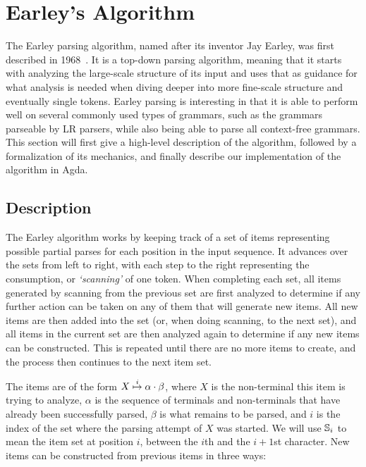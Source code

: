 \chapter{Earley's Algorithm} \label{Earleys}

	The Earley parsing algorithm, named after its inventor Jay Earley, was
	first described in 1968~\cite{Earley}. It is a top-down parsing algorithm,
	meaning that it starts with analyzing the large-scale structure of its
	input and uses that as guidance for what analysis is needed when diving
	deeper into more fine-scale structure and eventually single tokens.  Earley
	parsing is interesting in that it is able to perform well on several
	commonly used types of grammars, such as the grammars parseable by LR
	parsers, while also being able to parse all context-free grammars. This
	section will first give a high-level description of the algorithm, followed
	by a formalization of its mechanics, and finally describe our
	implementation of the algorithm in Agda.

	\section{Description}

		The Earley algorithm works by keeping track of a set of items
		representing possible partial parses for each position in the input
		sequence. It advances over the sets from left to right, with each step
		to the right representing the consumption, or \emph{`scanning'} of one
		token. When completing each set, all items generated by scanning from
		the previous set are first analyzed to determine if any further action
		can be taken on any of them that will generate new items. All new items
		are then added into the set (or, when doing scanning, to the next set),
		and all items in the current set are then analyzed again to determine
		if any new items can be constructed. This is repeated until there are
		no more items to create, and the process then continues to the next
		item set.

		The items are of the form $X\overset{i}{\mapsto}\alpha\cdot\beta$, where $X$ is
		the non-terminal this item is trying to analyze, $\alpha$ is the
		sequence of terminals and non-terminals that have already been
		successfully parsed, $\beta$ is what remains to be parsed, and $i$ is
		the index of the set where the parsing attempt of $X$ was started. We
		will use $\mathbb{S}_{i}$ to mean the item set at position $i$, between
		the $i$th and the $i+1$st character. New items can be constructed from
		previous items in three ways:

